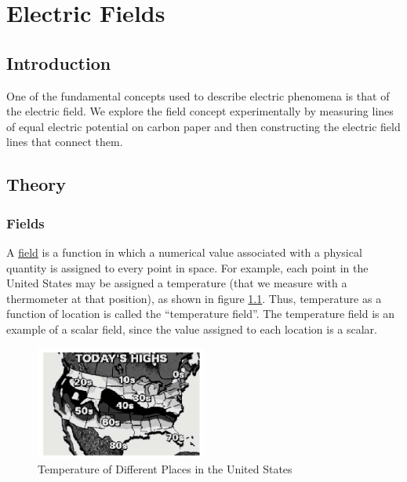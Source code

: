 \chapter{Electric Fields}

\section{Introduction}

One of the fundamental concepts used to describe electric phenomena is that of the electric field. We explore the field concept experimentally by measuring lines of equal electric potential on carbon paper and then constructing the electric field lines that connect them.

\section{Theory}

\subsection{Fields}

A \underline{field} is a function in which a numerical value associated with a physical quantity is assigned to every point in space. For example, each point in the United States may be assigned a temperature (that we measure with a thermometer at that position), as shown in figure \ref{fig:temp_field}. Thus, temperature as a function of location is called the ``temperature field''. The temperature field is an example of a scalar field, since the value assigned to each location is a scalar.

\begin{figure}[h]
    \begin{center}
        \includegraphics[width=0.5\textwidth]{./Exp1/pic/image1.png}
    \end{center}
    \caption{Temperature of Different Places in the United States}
    \label{fig:temp_field}
\end{figure}

